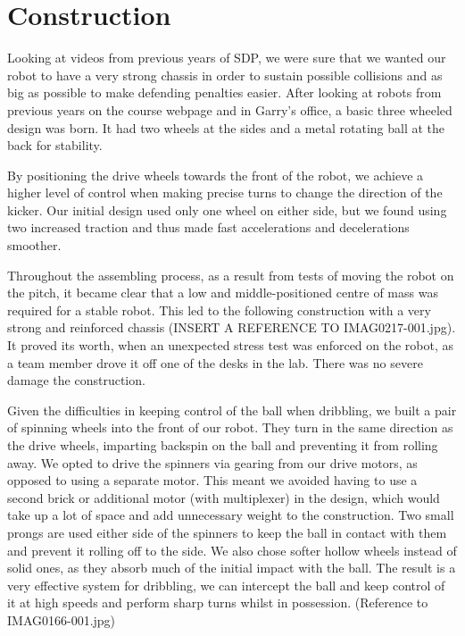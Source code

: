 \section{Construction}

Looking at videos from previous years of SDP, we were sure that we wanted our robot to have a very strong chassis in order to sustain possible collisions and as big as possible to make defending penalties easier. After looking at robots from previous years on the course webpage and in Garry's office, a basic three wheeled design was born. It had two wheels at the sides and a metal rotating ball at the back for stability.

By positioning the drive wheels towards the front of the robot, we achieve a higher level of control when making precise turns to change the direction of the kicker. Our initial design used only one wheel on either side, but we found using two increased traction and thus made fast accelerations and decelerations smoother.

Throughout the assembling process, as a result from tests of moving the robot on the pitch, it became clear that a low and middle-positioned centre of mass was required for a stable robot. This led to the following construction with a very strong and reinforced chassis (INSERT A REFERENCE TO  IMAG0217-001.jpg). It proved its worth, when an unexpected stress test was enforced on the robot, as a team member drove it off one of the desks in the lab. There was no severe damage the construction. 

Given the difficulties in keeping control of the ball when dribbling, we built a pair of spinning wheels into the front of our robot. They turn in the same direction as the drive wheels, imparting backspin on the ball and preventing it from rolling away. We opted to drive the spinners via gearing from our drive motors, as opposed to using a separate motor. This meant we avoided having to use a second brick or additional motor (with multiplexer) in the design, which would take up a lot of space and add unnecessary weight to the construction. Two small prongs are used either side of the spinners to keep the ball in contact with them and prevent it rolling off to the side. We also chose softer hollow wheels instead of solid ones, as they absorb much of the initial impact with the ball. The result is a very effective system for dribbling, we can intercept the ball and keep control of it at high speeds and perform sharp turns whilst in possession. (Reference to IMAG0166-001.jpg)

